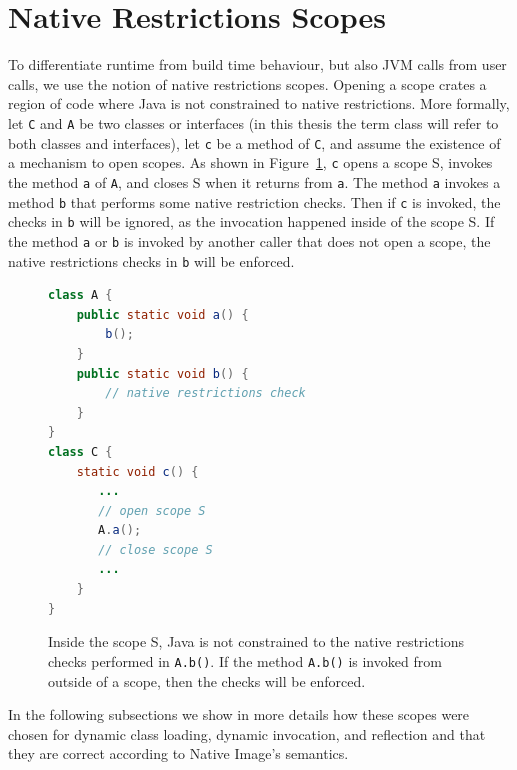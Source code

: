 \section{Native Restrictions Scopes}
To differentiate runtime from build time behaviour, but also JVM calls from user calls, we use the notion of native restrictions scopes. Opening a scope crates a region of code where Java is not constrained to native restrictions. 
More formally, let \verb|C| and \verb|A| be two classes or interfaces (in this thesis the term class will refer to both classes and interfaces), let \verb|c| be a method of \verb|C|, and assume the existence of a mechanism to open scopes. As shown in Figure~\ref{fig:scopes}, \verb|c| opens a scope S, invokes the method \verb|a| of \verb|A|, and closes S when it returns from \verb|a|. The method \verb|a| invokes a method \verb|b| that performs some native restriction checks.
Then if \verb|c| is invoked, the checks in \verb|b| will be ignored, as the invocation happened inside of the scope S.
If the method \verb|a| or \verb|b| is invoked by another caller that does not open a scope, the native restrictions checks in \verb|b| will be enforced.

\begin{figure}[ht]
    \centering
\begin{lstlisting}[language=Java]
class A {
    public static void a() {
        b(); 
    }
    public static void b() {
        // native restrictions check
    }
} 
class C {
    static void c() {
       ...
       // open scope S
       A.a();
       // close scope S
       ...
    }
}
\end{lstlisting}
    \caption{Inside the scope S, Java is not constrained to the native restrictions checks performed in \texttt{A.b()}. If the method \texttt{A.b()} is invoked from outside of a scope, then the checks will be enforced.}
    \label{fig:scopes}
\end{figure}

In the following subsections we show in more details how these scopes were chosen for dynamic class loading, dynamic invocation, and reflection and that they are correct according to Native Image's semantics.

